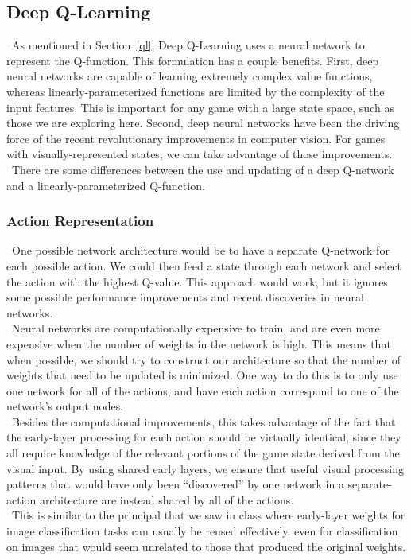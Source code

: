 \documentclass[conference]{IEEEtran}
\begin{document}
\subsection{Deep Q-Learning}\label{deep_q}
\noindent\ As mentioned in Section~\ref{ql}, Deep Q-Learning uses a neural
network to represent the Q-function. This formulation has a couple benefits.
First, deep neural networks are capable of learning extremely complex value
functions, whereas linearly-parameterized functions are limited by the
complexity of the input features. This is important for any game with a large
state space, such as those we are exploring here. Second, deep neural networks
have been the driving force of the recent revolutionary improvements in
computer vision. For games with visually-represented states, we can take
advantage of those improvements.\\
\indent\ There are some differences between the use and updating of a deep
Q-network and a linearly-parameterized Q-function.

\subsubsection{Action Representation}
\noindent\ One possible network architecture would be to have a separate
Q-network for each possible action. We could then feed a state through each
network and select the action with the highest Q-value. This approach would
work, but it ignores some possible performance improvements and recent
discoveries in neural networks.\\
\indent\ Neural networks are computationally expensive to train, and are even
more expensive when the number of weights in the network is high. This means
that when possible, we should try to construct our architecture so that the
number of weights that need to be updated is minimized. One way to do this is
to only use one network for all of the actions, and have each action correspond
to one of the network's output nodes.\\
\indent\ Besides the computational improvements, this takes advantage of the
fact that the early-layer processing for each action should be virtually
identical, since they all require knowledge of the relevant portions of the
game state derived from the visual input.  By using shared early layers, we
ensure that useful visual processing patterns that would have only been
``discovered'' by one network in a separate-action architecture are instead
shared by all of the actions.\\
\indent\ This is similar to the principal that we saw in class where
early-layer weights for image classification tasks can usually be reused
effectively, even for classification on images that would seem unrelated to
those that produced the original weights.
\end{document}
